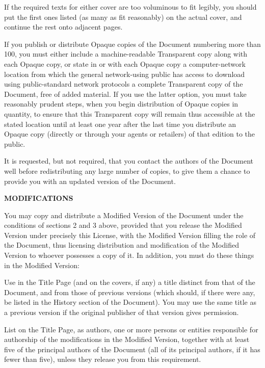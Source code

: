 If the required texts for either cover are too voluminous to fit legibly, you should put the first ones listed (as many as fit reasonably) on the actual cover, and continue the rest onto adjacent pages.

If you publish or distribute Opaque copies of the Document numbering more than 100, you must either include a machine-readable Transparent copy along with each Opaque copy, or state in or with each Opaque copy a computer-network location from which the general network-using public has access to download using public-standard network protocols a complete Transparent copy of the Document, free of added material. If you use the latter option, you must take reasonably prudent steps, when you begin distribution of Opaque copies in quantity, to ensure that this Transparent copy will remain thus accessible at the stated location until at least one year after the last time you distribute an Opaque copy (directly or through your agents or retailers) of that edition to the public.

It is requested, but not required, that you contact the authors of the Document well before redistributing any large number of copies, to give them a chance to provide you with an updated version of the Document.

\item
{\bf MODIFICATIONS}

You may copy and distribute a Modified Version of the Document under the conditions of sections 2 and 3 above, provided that you release the Modified Version under precisely this License, with the Modified Version filling the role of the Document, thus licensing distribution and modification of the Modified Version to whoever possesses a copy of it.  In addition, you must do these things in the Modified Version:

\startitemize[A]
\item
Use in the Title Page (and on the covers, if any) a title distinct from that of the Document, and from those of previous versions (which should, if there were any, be listed in the History section of the Document).  You may use the same title as a previous version if the original publisher of that version gives permission.

\item
List on the Title Page, as authors, one or more persons or entities responsible for authorship of the modifications in the Modified Version, together with at least five of the principal authors of the Document (all of its principal authors, if it has fewer than five), unless they release you from this requirement.

